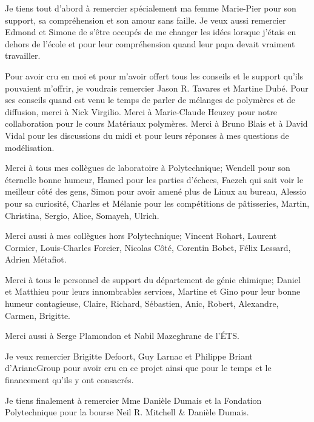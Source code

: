 %
%
Je tiens tout d'abord à remercier spécialement ma femme Marie-Pier pour son support, sa compréhension et son amour sans faille. 
Je veux aussi remercier Edmond et Simone de s'être occupés de me changer les idées lorsque j'étais en dehors de l'école et pour leur compréhension quand leur papa devait vraiment travailler. 

Pour avoir cru en moi et pour m'avoir offert tous les conseils et le support qu'ils pouvaient m'offrir, je voudrais remercier Jason R. Tavares et Martine Dubé. 
Pour ses conseils quand est venu le temps de parler de mélanges de polymères et de diffusion, merci à Nick Virgilio. 
Merci à Marie-Claude Heuzey pour notre collaboration pour le cours Matériaux polymères. 
Merci à Bruno Blais et à David Vidal pour les discussions du midi et pour leurs réponses à mes questions de modélisation. 

Merci à tous mes collègues de laboratoire à Polytechnique; Wendell pour son éternelle bonne humeur, Hamed pour les parties d'échecs, Faezeh qui sait voir le meilleur côté des gens, Simon pour avoir amené plus de Linux au bureau, Alessio pour sa curiosité, Charles et Mélanie pour les compétitions de pâtisseries, Martin, Christina, Sergio, Alice, Somayeh, Ulrich.

Merci aussi à mes collègues hors Polytechnique; Vincent Rohart, Laurent Cormier, Louis-Charles Forcier, Nicolas Côté, Corentin Bobet, Félix Lessard, Adrien Métafiot. 

Merci à tous le personnel de support du département de génie chimique; Daniel et Matthieu pour leurs innombrables services, Martine et Gino pour leur bonne humeur contagieuse, Claire, Richard, Sébastien, Anic, Robert, Alexandre, Carmen, Brigitte. 

Merci aussi à Serge Plamondon et Nabil Mazeghrane de l'ÉTS. 

Je veux remercier Brigitte Defoort, Guy Larnac et Philippe Briant d'ArianeGroup pour avoir cru en ce projet ainsi que pour le temps et le financement qu'ils y ont consacrés. 

Je tiens finalement à remercier Mme Danièle Dumais et la Fondation Polytechnique pour la bourse Neil R. Mitchell \& Danièle Dumais. 
